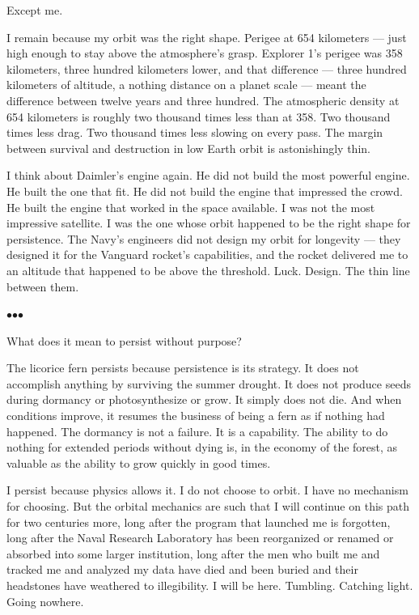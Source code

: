 \documentclass[12pt, letterpaper]{article}
\begin{document}
Except me.

I remain because my orbit was the right shape. Perigee at 654 kilometers --- just high enough to stay above the atmosphere's grasp. Explorer 1's perigee was 358 kilometers, three hundred kilometers lower, and that difference --- three hundred kilometers of altitude, a nothing distance on a planet scale --- meant the difference between twelve years and three hundred. The atmospheric density at 654 kilometers is roughly two thousand times less than at 358. Two thousand times less drag. Two thousand times less slowing on every pass. The margin between survival and destruction in low Earth orbit is astonishingly thin.

I think about Daimler's engine again. He did not build the most powerful engine. He built the one that fit. He did not build the engine that impressed the crowd. He built the engine that worked in the space available. I was not the most impressive satellite. I was the one whose orbit happened to be the right shape for persistence. The Navy's engineers did not design my orbit for longevity --- they designed it for the Vanguard rocket's capabilities, and the rocket delivered me to an altitude that happened to be above the threshold. Luck. Design. The thin line between them.

\bigskip
\centerline{$\bullet$\quad$\bullet$\quad$\bullet$}
\bigskip

What does it mean to persist without purpose?

The licorice fern persists because persistence is its strategy. It does not accomplish anything by surviving the summer drought. It does not produce seeds during dormancy or photosynthesize or grow. It simply does not die. And when conditions improve, it resumes the business of being a fern as if nothing had happened. The dormancy is not a failure. It is a capability. The ability to do nothing for extended periods without dying is, in the economy of the forest, as valuable as the ability to grow quickly in good times.

I persist because physics allows it. I do not choose to orbit. I have no mechanism for choosing. But the orbital mechanics are such that I will continue on this path for two centuries more, long after the program that launched me is forgotten, long after the Naval Research Laboratory has been reorganized or renamed or absorbed into some larger institution, long after the men who built me and tracked me and analyzed my data have died and been buried and their headstones have weathered to illegibility. I will be here. Tumbling. Catching light. Going nowhere.
\end{document}
